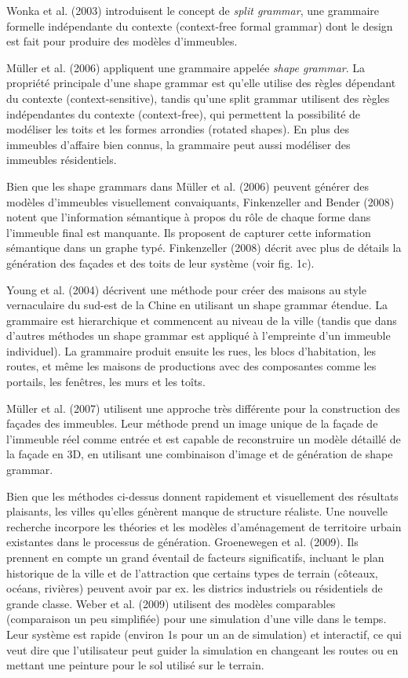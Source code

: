 \documentclass[11pt]{article}
\begin{document}
Wonka et al. (2003) introduisent le concept de \textit{split grammar}, une grammaire formelle indépendante du contexte (context-free formal grammar) dont le design est fait pour produire des modèles d'immeubles. 

Müller et al. (2006) appliquent une grammaire appelée \textit{shape grammar}. La propriété principale d'une shape grammar est qu'elle utilise des règles dépendant du contexte (context-sensitive), tandis qu'une split grammar utilisent des règles indépendantes du contexte (context-free), qui permettent la possibilité de modéliser les toits et les formes arrondies (rotated shapes). En plus des immeubles d'affaire bien connus, la grammaire peut aussi modéliser des immeubles résidentiels. \newline

Bien que les shape grammars dans Müller et al. (2006) peuvent générer des modèles d'immeubles visuellement convaiquants, Finkenzeller and Bender (2008) notent que l'information sémantique à propos du rôle de chaque forme dans l'immeuble final est manquante. Ils proposent de capturer cette information sémantique dans un graphe typé. Finkenzeller (2008) décrit avec plus de détails la génération des façades et des toits de leur système (voir fig. 1c). \newline

Young et al. (2004) décrivent une méthode pour créer des maisons au style vernaculaire du sud-est de la Chine en utilisant un shape grammar étendue. La grammaire est hierarchique et commencent au niveau de la ville (tandis que dans d'autres méthodes un shape grammar est appliqué à l'empreinte d'un immeuble individuel). La grammaire produit ensuite les rues, les blocs d'habitation, les routes, et même les maisons de productions avec des composantes comme les portails, les fenêtres, les murs et les toîts. \newline

Müller et al. (2007) utilisent une approche très différente pour la construction des façades des immeubles. Leur méthode prend un image unique de la façade de l'immeuble réel comme entrée et est capable de reconstruire un modèle détaillé de la façade en 3D, en utilisant une combinaison d'image et de génération de shape grammar. \newline

Bien que les méthodes ci-dessus donnent rapidement et visuellement des résultats plaisants, les villes qu'elles génèrent manque de structure réaliste. Une nouvelle recherche incorpore les théories et les modèles d'aménagement de territoire urbain existantes dans le processus de génération. Groenewegen et al. (2009). Ils prennent en compte un grand éventail de facteurs significatifs, incluant le plan historique de la ville et de l'attraction que certains types de terrain (côteaux, océans, rivières) peuvent avoir par ex. les districs industriels ou résidentiels de grande classe. Weber et al. (2009) utilisent des modèles comparables (comparaison un peu simplifiée) pour une simulation d'une ville dans le temps. Leur système est rapide (environ 1s pour un an de simulation) et interactif, ce qui veut dire que l'utilisateur peut guider la simulation en changeant les routes ou en mettant une peinture pour le sol utilisé sur le terrain.
\end{document}
